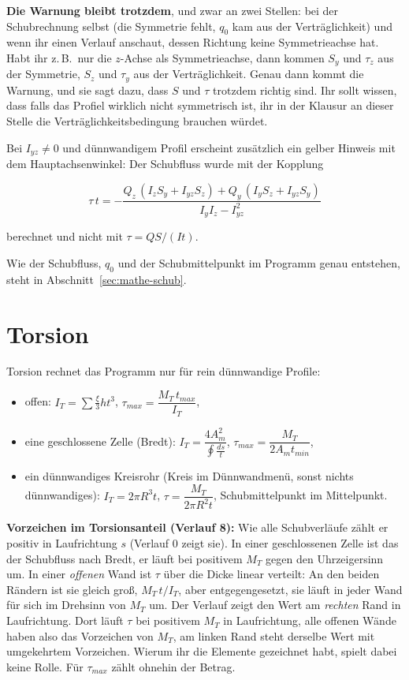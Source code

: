 \textbf{Die Warnung bleibt trotzdem}, und zwar an zwei Stellen: bei der Schubrechnung selbst
(die Symmetrie fehlt, $q_0$ kam aus der Verträglichkeit) und wenn ihr einen Verlauf anschaut,
dessen Richtung keine Symmetrieachse hat. Habt ihr z.\,B.\ nur die $z$-Achse als Symmetrieachse,
dann kommen $S_y$ und $\tau_z$ aus der Symmetrie, $S_z$ und $\tau_y$ aus der Verträglichkeit.
Genau dann kommt die Warnung, und sie sagt dazu, dass $S$ und $\tau$ trotzdem richtig sind. Ihr
sollt wissen, dass falls das Profiel wirklich nicht symmetrisch ist, ihr in der Klausur an dieser Stelle die Verträglichkeitsbedingung brauchen würdet.

Bei $I_{yz} \ne 0$ und dünnwandigem Profil erscheint zusätzlich ein gelber Hinweis mit dem
Hauptachsenwinkel: Der Schubfluss wurde mit der Kopplung

\[
  \tau\,t = -\frac{Q_z\,(I_z S_y + I_{yz} S_z) + Q_y\,(I_y S_z + I_{yz} S_y)}{I_y I_z - I_{yz}^2}
\]

berechnet und nicht mit $\tau = QS/(It)$.

Wie der Schubfluss, $q_0$ und der Schubmittelpunkt im Programm genau entstehen, steht in
Abschnitt~\ref{sec:mathe-schub}.

\section{Torsion}

Torsion rechnet das Programm nur für rein dünnwandige Profile:

\begin{itemize}
  \item offen: $I_T = \sum \frac{\xi}{3} h t^3$, \quad $\tau_{max} = \dfrac{M_T\,t_{max}}{I_T}$,
  \item eine geschlossene Zelle (Bredt): $I_T = \dfrac{4A_m^2}{\oint \frac{ds}{t}}$,
        \quad $\tau_{max} = \dfrac{M_T}{2 A_m t_{min}}$,
  \item ein dünnwandiges Kreisrohr (Kreis im Dünnwandmenü, sonst nichts dünnwandiges):
        $I_T = 2\pi R^3 t$, \quad $\tau = \dfrac{M_T}{2\pi R^2 t}$, Schubmittelpunkt im
        Mittelpunkt.
\end{itemize}

\textbf{Vorzeichen im Torsionsanteil (Verlauf 8):} Wie alle Schubverläufe zählt er positiv in
Laufrichtung $s$ (Verlauf 0 zeigt sie). In einer geschlossenen Zelle ist das der Schubfluss nach
Bredt, er läuft bei positivem $M_T$ gegen den Uhrzeigersinn um. In einer \emph{offenen} Wand ist
$\tau$ über die Dicke linear verteilt: An den beiden Rändern ist sie gleich groß, $M_T\,t/I_T$,
aber entgegengesetzt, sie läuft in jeder Wand für sich im Drehsinn von $M_T$ um. Der Verlauf zeigt
den Wert am \emph{rechten} Rand in Laufrichtung. Dort läuft $\tau$ bei positivem $M_T$ in
Laufrichtung, alle offenen Wände haben also das Vorzeichen von $M_T$, am linken Rand steht derselbe
Wert mit umgekehrtem Vorzeichen. Wierum ihr die Elemente gezeichnet habt, spielt dabei keine Rolle.
Für $\tau_{max}$ zählt ohnehin der Betrag.

